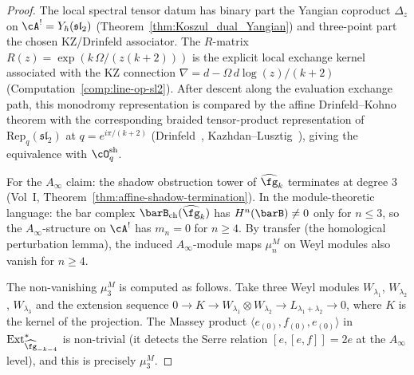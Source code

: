 \begin{proof}
The local spectral tensor datum has binary part the Yangian
coproduct $\Delta_z$ on $\cA^!=Y_\hbar(\mathfrak{sl}_2)$
(Theorem~\ref{thm:Koszul_dual_Yangian}) and three-point part the
chosen KZ/Drinfeld associator. The
$R$-matrix $R(z)=\exp(k\,\Omega/(z(k{+}2)))$ is the
explicit local exchange kernel associated with the KZ connection
$\nabla=d-\Omega\,d\log(z)/(k+2)$
(Computation~\ref{comp:line-op-sl2}). After descent along the
evaluation exchange path, this monodromy
representation is compared by the affine Drinfeld--Kohno theorem
with the corresponding braided tensor-product representation of
$\mathrm{Rep}_q(\mathfrak{sl}_2)$ at $q=e^{i\pi/(k+2)}$
(Drinfeld~\cite{Dri89}, Kazhdan--Lusztig~\cite{KL93}),
giving the equivalence with $\cO^{\mathrm{sh}}_q$.

For the $A_\infty$ claim: the shadow obstruction tower
of $\widehat{\fg}_k$ terminates at degree $3$
(Vol~I, Theorem~\ref*{thm:affine-shadow-termination}).
In the module-theoretic language: the bar complex
$\barB_{\mathrm{ch}}(\widehat{\fg}_k)$ has
$H^n(\barB)\ne 0$ only for $n\le 3$, so the
$A_\infty$-structure on $\cA^!$ has $m_n=0$ for $n\ge 4$.
By transfer (the homological perturbation lemma), the
induced $A_\infty$-module maps $\mu_n^M$ on Weyl modules
also vanish for $n\ge 4$.

The non-vanishing $\mu_3^M$ is computed as follows.
Take three Weyl modules $W_{\lambda_1}$, $W_{\lambda_2}$,
$W_{\lambda_3}$ and the extension sequence
$0\to K\to W_{\lambda_1}\otimes W_{\lambda_2}
\to L_{\lambda_1+\lambda_2}\to 0$,
where $K$ is the kernel of the projection. The Massey
product $\langle e_{(0)},f_{(0)},e_{(0)}\rangle$ in
$\operatorname{Ext}^*_{\widehat{\fg}_{-k-4}}$ is
non-trivial (it detects the Serre relation
$[e,[e,f]]=2e$ at the $A_\infty$ level), and this is
precisely $\mu_3^M$.
\end{proof}


